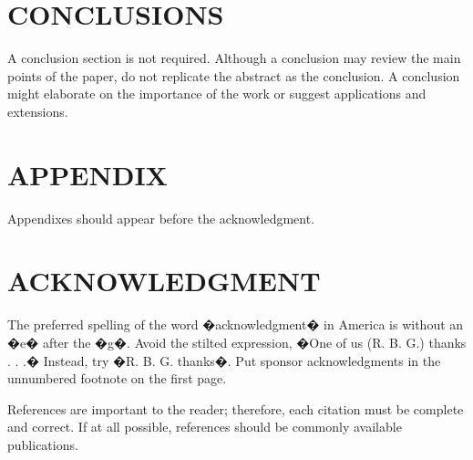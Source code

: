\documentclass[letterpaper, 10 pt, conference]{ieeeconf}  %
\begin{document}
\section{CONCLUSIONS}

A conclusion section is not required. Although a conclusion may review the main points of the paper, do not replicate the abstract as the conclusion. A conclusion might elaborate on the importance of the work or suggest applications and extensions. 

\addtolength{\textheight}{-12cm}   %







\section*{APPENDIX}

Appendixes should appear before the acknowledgment.

\section*{ACKNOWLEDGMENT}

The preferred spelling of the word �acknowledgment� in America is without an �e� after the �g�. Avoid the stilted expression, �One of us (R. B. G.) thanks . . .�  Instead, try �R. B. G. thanks�. Put sponsor acknowledgments in the unnumbered footnote on the first page.




References are important to the reader; therefore, each citation must be complete and correct. If at all possible, references should be commonly available publications.
\end{document}
